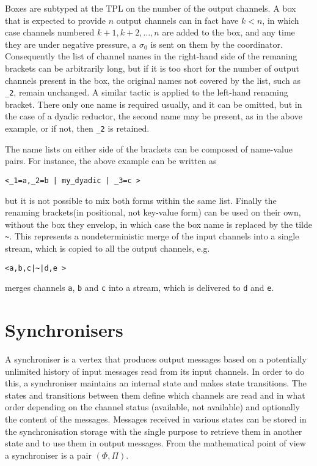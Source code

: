 \documentclass[11pt]{report}
\begin{document}
Boxes are subtyped at the TPL on the number of the output channels. A box that is expected to provide $n$ output channels can in fact have $k<n$, in which case channels numbered $k+1, k+2,\ldots, n$
are added to the box, and any time they are under negative pressure, a $\sigma_0$ is sent on them by the coordinator. Consequently the list of channel names in the right-hand side of the remaning brackets can be arbitrarily long, but if it is too short for the number of output channels present in the box, the original names not covered by the list, such as \verb$_2$, remain unchanged. A similar tactic is applied to the left-hand renaming bracket. There only one name is required usually, and it can be omitted, but in the case of a dyadic reductor, the second name may be present, as in the above example, or if not, then \verb$_2$ is retained.

The name lists on either side of the brackets can be composed of name-value pairs. For instance,
the above example can be written as
\begin{lstlisting}
<_1=a,_2=b | my_dyadic | _3=c >
\end{lstlisting}
but it is not possible to mix both forms within the same list. Finally the renaming brackets(in positional, not key-value form) can be used on their own, without the box they envelop, in which case the box name is replaced by the tilde \verb$~$. This represents a nondeterministic merge of the input channels into a single stream, which is copied to all the output channels, e.g.
\begin{lstlisting}
<a,b,c|~|d,e >
\end{lstlisting}
merges channels  \verb$a$, \verb$b$ and \verb$c$ into a stream, which is delivered to \verb$d$ and \verb$e$.

\section{Synchronisers\label{sec:synch}}

A synchroniser is a vertex that produces output messages based on a potentially unlimited history of input messages read from its input channels. In order to do this, a synchroniser maintains an internal state and makes state transitions. The states and transitions between them define which channels are read and in what order depending on the channel status (available, not available) and optionally the content of the messages.
Messages received in various states can be stored in the synchronisation storage with the single purpose to retrieve them in another state and to use them in output messages. From the mathematical point of view a synchroniser is a pair $(\Phi,\Pi)$.
\end{document}
